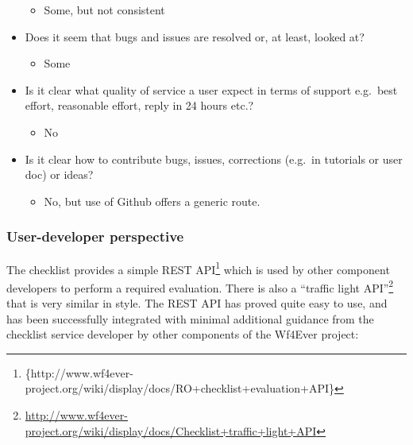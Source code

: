 \begin{itemize}
  \begin{itemize}
  \itemsep1pt\parskip0pt
  \item
    Some, but not consistent
  \end{itemize}
\item
  Does it seem that bugs and issues are resolved or, at least, looked
  at?

  \begin{itemize}
  \itemsep1pt\parskip0pt
  \item
    Some
  \end{itemize}
\item
  Is it clear what quality of service a user expect in terms of support
  e.g.~best effort, reasonable effort, reply in 24 hours etc.?

  \begin{itemize}
  \itemsep1pt\parskip0pt
  \item
    No
  \end{itemize}
\item
  Is it clear how to contribute bugs, issues, corrections (e.g.~in
  tutorials or user doc) or ideas?

  \begin{itemize}
  \itemsep1pt\parskip0pt
  \item
    No, but use of Github offers a generic route.
  \end{itemize}
\end{itemize}

\subsubsection{User-developer perspective}

The checklist provides a simple REST API\footnote{\{http://www.wf4ever-project.org/wiki/display/docs/RO+checklist+evaluation+API\}}
which is used by other component developers to perform a required
evaluation. There is also a ``traffic light API''\footnote{\url{http://www.wf4ever-project.org/wiki/display/docs/Checklist+traffic+light+API}}
that is very similar in style. The REST API has proved quite easy to
use, and has been successfully integrated with minimal additional
guidance from the checklist service developer by other components of the
Wf4Ever project:


